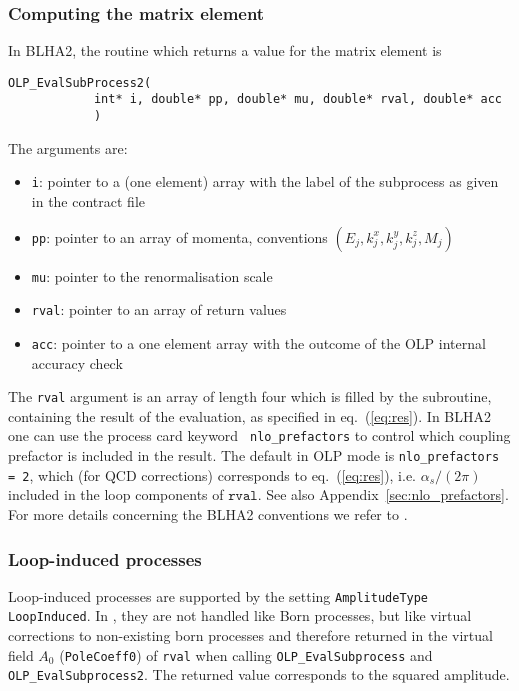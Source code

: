 \subsubsection{Computing the matrix element}
In BLHA2, the routine which returns a value for the matrix element is
\begin{lstlisting}[style=C]
      OLP_EvalSubProcess2(
            int* i, double* pp, double* mu, double* rval, double* acc
            )
\end{lstlisting}
The arguments are:
\begin{itemize}
\item \texttt{i}: pointer to a (one element) array with the label of the subprocess as given in the contract file
\item \texttt{pp}: pointer to an array of momenta, conventions $(E_j,k_j^x,k_j^y,k_j^z,M_j)$
\item \texttt{mu}: pointer to the renormalisation scale 
\item \texttt{rval}: pointer to an array of return values
\item \texttt{acc}: pointer to a one element array with the outcome of the 
OLP internal accuracy check 
\end{itemize}
The \texttt{rval} argument is an array of length four which is filled by the subroutine, containing the result of the evaluation, as specified in eq.~(\ref{eq:res}). In BLHA2 one can use the process card keyword \texttt{ nlo\_prefactors} to control which coupling prefactor is included in the result. The default in OLP mode is \texttt{nlo\_prefactors = 2}, which (for QCD corrections) corresponds to eq.~(\ref{eq:res}), i.e. $\alpha_s/(2\pi)$ included in the loop components of $\texttt{rval}$. See also Appendix~\ref{sec:nlo_prefactors}. For more details concerning the BLHA2 conventions we refer to \cite{Alioli:2013nda}.


\subsubsection{Loop-induced processes}
Loop-induced processes are supported by the setting \lstinline[style=sh]|AmplitudeType LoopInduced|. In \gosam, they are not handled like Born processes, but like virtual corrections to non-existing born processes and therefore returned in the virtual field $A_0$ (\texttt{PoleCoeff0}) of \texttt{rval} when calling \texttt{OLP\_EvalSubprocess} and \texttt{OLP\_EvalSubprocess2}. The returned value corresponds to the  squared amplitude.

